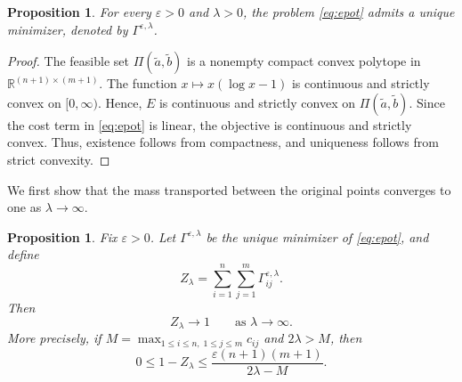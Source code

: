 \documentclass[a4paper,11pt]{article}
\numberwithin{equation}{section}
\newtheorem{prop}[thm]{Proposition}
\newcommand{\eps}{\varepsilon}
\newcommand{\RR}{\mathbb{R}}
\begin{document}
\begin{prop}\label{prop:exist-unique}
For every $\eps > 0$ and $\lambda > 0$, the problem \eqref{eq:epot} admits a unique minimizer, denoted by $\Gamma^{\eps,\lambda}$.
\end{prop}

\begin{proof}
The feasible set $\Pi(\widetilde a,\widetilde b)$ is a nonempty compact convex polytope in $\RR^{(n+1)\times(m+1)}$. The function $x\mapsto x(\log x-1)$ is continuous and strictly convex on $[0,\infty)$. Hence, $E$ is continuous and strictly convex on $\Pi(\widetilde a,\widetilde b)$. Since the cost term in \eqref{eq:epot} is linear, the objective is continuous and strictly convex. Thus, existence follows from compactness, and uniqueness follows from strict convexity.
\end{proof}

We first show that the mass transported between the original points converges to one as $\lambda\to\infty$.

\begin{prop}\label{prop:mass-convergence}
Fix $\eps > 0$. Let $\Gamma^{\eps,\lambda}$ be the unique minimizer of \eqref{eq:epot}, and define
\begin{equation*}
  Z_{\lambda} = \sum_{i=1}^{n}\sum_{j=1}^{m}\Gamma^{\eps,\lambda}_{ij}.
\end{equation*}
Then
\begin{equation}\label{eq:zlambda-to-one}
  Z_{\lambda}\to 1\qquad\text{as }\lambda \to \infty.
\end{equation}
More precisely, if $M = \displaystyle \max_{1\leq i\leq n,\;1\leq j\leq m}c_{ij}$ and $2\lambda > M$, then
\begin{equation}\label{eq:mass-rate}
  0 \leq 1 - Z_{\lambda} \leq \frac{\eps(n + 1)(m + 1)}{2\lambda - M}.
\end{equation}
\end{prop}
\end{document}
